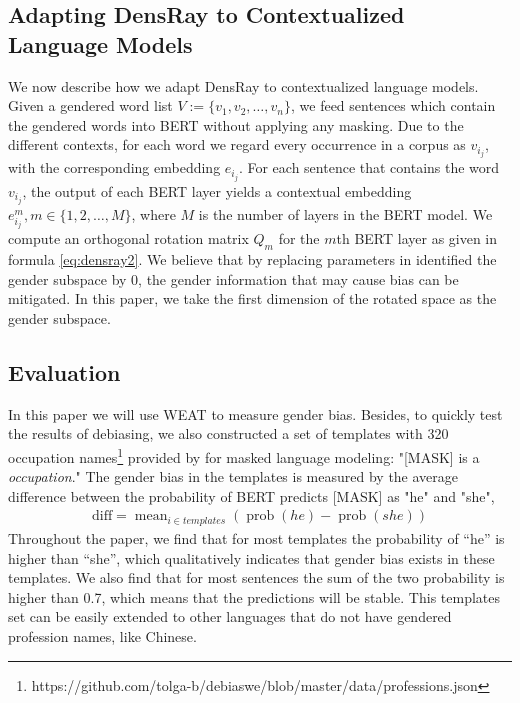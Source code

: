 \subsection{Adapting DensRay to Contextualized Language Models}
We now describe how we adapt
DensRay to contextualized
language models. Given a gendered word list
$V:=\{v_1,v_2,\dots,v_n\}$, we feed sentences which contain
the gendered words into BERT without applying any
masking. Due to the different contexts, for each word we
regard every occurrence in a corpus as $v_{i_j}$, with the corresponding embedding $e_{i_j}$. For
each sentence that contains the word $v_{i_j}$, the output
of each BERT layer yields a contextual embedding
$e_{i_j}^m,m\in\{1,2,\dots,M\}$, where $M$ is the number of
layers in the BERT model. We compute an orthogonal rotation
matrix $Q_m$ for the $m$th BERT layer as given in formula
\ref{eq:densray2}. We believe that by replacing parameters
in identified the gender subspace by $0$, the gender
information that may cause bias can be mitigated. In this
paper, we take the first dimension of the rotated space as
the gender subspace.

\subsection{Evaluation}\label{sec:eval}
In this paper we will use WEAT to measure gender bias. Besides, to quickly test the results of debiasing, we also constructed a set of templates with 320 occupation names\footnote{https://github.com/tolga-b/debiaswe/blob/master/data/professions.json} provided by \citet{bolukbasi2016man} for masked language modeling: "[MASK] is a \textit{occupation}." The gender bias in the templates is measured by the average difference between the probability of BERT predicts [MASK] as "he" and "she",
\begin{eqnarray}
    \text{diff}=\mathop{mean}_{i \in templates}(\mathop{prob}(he)-\mathop{prob}(she))\nonumber
\end{eqnarray}
Throughout the paper, we find that for most templates the probability of ``he'' is higher than ``she'', which qualitatively indicates that gender bias exists in these templates. We also find that for most sentences the sum of the two probability is higher than 0.7, which means that the predictions will be stable. This templates set can be easily extended to other languages that do not have gendered profession names, like Chinese.
